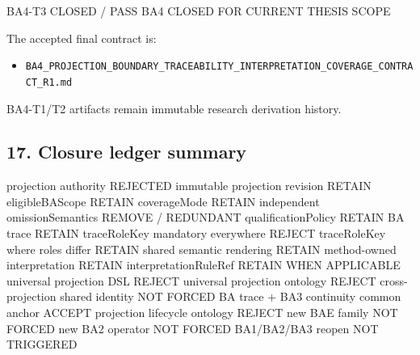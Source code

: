 \documentclass[
  11pt,
  a4paper,
]{article}
\newenvironment{Shaded}{}{}
\newcommand{\NormalTok}[1]{#1}
\providecommand{\tightlist}{%
  \setlength{\itemsep}{0pt}\setlength{\parskip}{0pt}}
\begin{document}
\begin{Shaded}
\begin{Highlighting}[]
\NormalTok{BA4{-}T3   CLOSED / PASS}
\NormalTok{BA4      CLOSED FOR CURRENT THESIS SCOPE}
\end{Highlighting}
\end{Shaded}

The accepted final contract is:

\begin{itemize}
\tightlist
\item
  \texttt{BA4\_PROJECTION\_BOUNDARY\_TRACEABILITY\_INTERPRETATION\_COVERAGE\_CONTRACT\_R1.md}
\end{itemize}

BA4-T1/T2 artifacts remain immutable research derivation history.

\subsection{17. Closure ledger summary}\label{closure-ledger-summary}

\begin{Shaded}
\begin{Highlighting}[]
\NormalTok{projection authority                                    REJECTED}
\NormalTok{immutable projection revision                           RETAIN}
\NormalTok{eligibleBAScope                                         RETAIN}
\NormalTok{coverageMode                                            RETAIN}
\NormalTok{independent omissionSemantics                           REMOVE / REDUNDANT}
\NormalTok{qualificationPolicy                                     RETAIN}
\NormalTok{BA trace                                                RETAIN}
\NormalTok{traceRoleKey mandatory everywhere                       REJECT}
\NormalTok{traceRoleKey where roles differ                         RETAIN}
\NormalTok{shared semantic rendering                               RETAIN}
\NormalTok{method{-}owned interpretation                             RETAIN}
\NormalTok{interpretationRuleRef                                   RETAIN WHEN APPLICABLE}
\NormalTok{universal projection DSL                                REJECT}
\NormalTok{universal projection ontology                           REJECT}
\NormalTok{cross{-}projection shared identity                        NOT FORCED}
\NormalTok{BA trace + BA3 continuity common anchor                 ACCEPT}
\NormalTok{projection lifecycle ontology                           REJECT}
\NormalTok{new BAE family                                          NOT FORCED}
\NormalTok{new BA2 operator                                        NOT FORCED}
\NormalTok{BA1/BA2/BA3 reopen                                      NOT TRIGGERED}
\end{Highlighting}
\end{Shaded}
\end{document}
